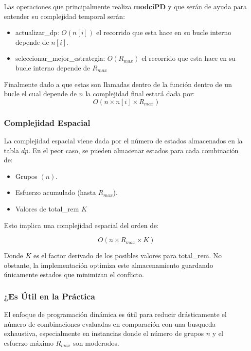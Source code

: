 \documentclass[11pt,letter]{article}
\begin{document}
\begin{itemize}
    Las operaciones que principalmente realiza \textbf{modciPD} y que serán de ayuda para entender su complejidad temporal serán:

    \begin{itemize}
        \item actualizar\_dp: $O(n[i])$ el recorrido que esta hace en su bucle interno depende de $n[i]$.

        \item seleccionar\_mejor\_estrategia: $O(R_{max})$ el recorrido que esta hace en su bucle interno depende de $R_{max}$
    \end{itemize}

    Finalmente dado a que estas son llamadas dentro de la función dentro de un bucle el cual depende de $n$ la complejidad final estará dada por:
    $$O(n\times n[i] \times R_{max})$$

    \subsubsection{Complejidad Espacial}
    La complejidad espacial viene dada por el número de estados almacenados en la tabla $dp$. En el peor caso, se pueden almacenar estados para cada combinación de:

    \begin{itemize}
        \item Grupos $(n)$.
        \item Esfuerzo acumulado (hasta $R_{max}$).
        \item Valores de total\_rem $K$
    \end{itemize}

    Esto implica una complejidad espacial del orden de:

    \[
        O(n \times R_{max} \times K)
    \]

    Donde $K$ es el factor derivado de los posibles valores para total\_rem. No obstante, la implementación optimiza este almacenamiento guardando únicamente estados que minimizan el conflicto.

    \subsubsection{¿Es Útil en la Práctica}
    El enfoque de programación dinámica es útil para reducir drásticamente el número de combinaciones evaluadas en comparación con una busqueda exhaustiva, especialmente en instancias donde el número de grupos $n$ y el esfuerzo máximo $R_{max}$ son moderados.


\end{itemize}
\end{document}
